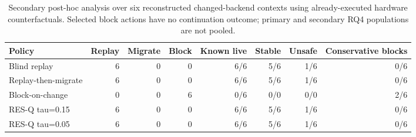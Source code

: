 \begin{table}[t]
\centering
\small
\caption{Secondary post-hoc analysis over six reconstructed changed-backend contexts using already-executed hardware counterfactuals. Selected block actions have no continuation outcome; primary and secondary RQ4 populations are not pooled.}
\label{tab:hardware-rq4-secondary}
\begin{tabular}{@{}lrrrrrrr@{}}
\toprule
\textbf{Policy} & \textbf{Replay} & \textbf{Migrate} & \textbf{Block} & \textbf{Known live} & \textbf{Stable} & \textbf{Unsafe} & \textbf{Conservative blocks} \\
\midrule
Blind replay & 6 & 0 & 0 & 6/6 & 5/6 & 1/6 & 0/6 \\
Replay-then-migrate & 6 & 0 & 0 & 6/6 & 5/6 & 1/6 & 0/6 \\
Block-on-change & 0 & 0 & 6 & 0/6 & 0/0 & 0/0 & 2/6 \\
RES-Q tau=0.15 & 6 & 0 & 0 & 6/6 & 5/6 & 1/6 & 0/6 \\
RES-Q tau=0.05 & 6 & 0 & 0 & 6/6 & 5/6 & 1/6 & 0/6 \\
\bottomrule
\end{tabular}
\end{table}
